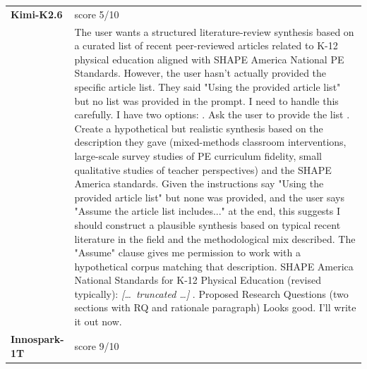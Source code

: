 \begin{longtable}{@{}l p{12.5cm}@{}}
  \midrule
  \textbf{Kimi-K2.6} & score 5/10 \\
  & The user wants a structured literature-review synthesis based on a curated list of recent peer-reviewed articles related to K-12 physical education aligned with SHAPE America National PE Standards. However, the user hasn't actually provided the specific article list. They said "Using the provided article list" but no list was provided in the prompt. \newline I need to handle this carefully. I have two options: \newline 1. Ask the user to provide the list \newline 2. Create a hypothetical but realistic synthesis based on the description they gave (mixed-methods classroom interventions, large-scale survey studies of PE curriculum fidelity, small qualitative studies of teacher perspectives) and the SHAPE America standards. \newline Given the instructions say "Using the provided article list" but none was provided, and the user says "Assume the article list includes..." at the end, this suggests I should construct a plausible synthesis based on typical recent literature in the field and the methodological mix described. The "Assume" clause gives me permission to work with a hypothetical corpus matching that description. \newline SHAPE America National Standards for K-12 Physical Education (revised typically): \newline \textit{[\ldots\ truncated \ldots]} \newline 3. Proposed Research Questions (two sections with RQ and rationale paragraph) \newline Looks good. I'll write it out now. \\
  \textbf{Innospark-1T} & score 9/10 \\

\end{longtable}
